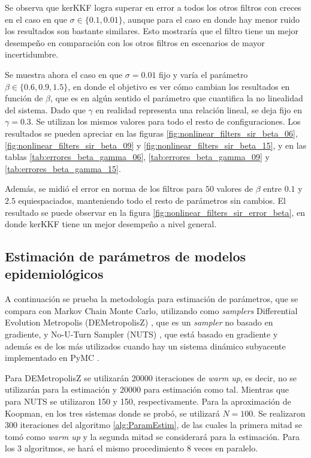 Se observa que kerKKF logra superar en error a todos los otros filtros con creces en el caso en que $\sigma \in \{ 0.1, 0.01\}$, aunque para el caso en donde hay menor ruido los resultados son bastante similares. Esto mostraría que el filtro tiene un mejor desempeño en comparación con los otros filtros en escenarios de mayor incertidumbre.

Se muestra ahora el caso en que $\sigma = 0.01$ fijo y varía el parámetro $\beta \in \{0.6, 0.9, 1.5\}$, en donde el objetivo es ver cómo cambian los resultados en función de $\beta$, que es en algún sentido el parámetro que cuantifica la no linealidad del sistema. Dado que $\gamma$ en realidad representa una relación lineal, se deja fijo en $\gamma = 0.3$. Se utilizan los mismos valores para todo el resto de configuraciones. Los resultados se pueden apreciar en las figuras \ref{fig:nonlinear_filters_sir_beta_06}, \ref{fig:nonlinear_filters_sir_beta_09} y \ref{fig:nonlinear_filters_sir_beta_15}, y en las tablas \ref{tab:errores_beta_gamma_06}, \ref{tab:errores_beta_gamma_09} y \ref{tab:errores_beta_gamma_15}.

Además, se midió el error en norma de los filtros para $50$ valores de $\beta$ entre $0.1$ y $2.5$ equiespaciados, manteniendo todo el resto de parámetros sin cambios. El resultado se puede observar en la figura \ref{fig:nonlinear_filters_sir_error_beta}, en donde kerKKF tiene un mejor desempeño a nivel general.

\subsection{Estimación de parámetros de modelos epidemiológicos}

A continuación se prueba la metodología para estimación de parámetros, que se compara con Markov Chain Monte Carlo, utilizando como \textit{samplers} Differential Evolution Metropolis (DEMetropolisZ) \cite{terBraak2008DifferentialChains}, que es un \textit{sampler} no basado en gradiente, y No-U-Turn Sampler (NUTS) \cite{Hoffman2014TheCarlo}, que está basado en gradiente y además es de los más utilizados cuando hay un sistema dinámico subyacente implementado en PyMC \cite{Patil2010PyMC:Python}.

Para DEMetropolisZ se utilizarán 20000 iteraciones de \textit{warm up}, es decir, no se utilizarán para la estimación y 20000 para estimación como tal. Mientras que para NUTS se utilizaron 150 y 150, respectivamente. Para la aproximación de Koopman, en los tres sistemas donde se probó, se utilizará $N=100$. Se realizaron 300 iteraciones del algoritmo \ref{alg:ParamEstim}, de las cuales la primera mitad se tomó como \textit{warm up} y la segunda mitad se considerará para la estimación. Para los 3 algoritmos, se hará el mismo procedimiento 8 veces en paralelo.

